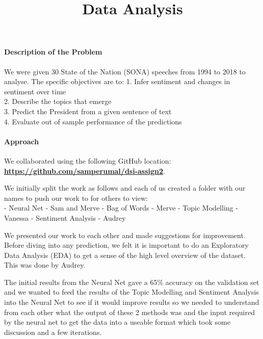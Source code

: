 \documentclass[]{article}
\title{Data Analysis}
\author{}
\date{}
\let\oldparagraph\paragraph
\renewcommand{\paragraph}[1]{\oldparagraph{#1}\mbox{}}
\begin{document}
\maketitle

\hypertarget{description-of-the-problem}{%
\paragraph{\texorpdfstring{\textbf{Description of the
Problem}}{Description of the Problem}}\label{description-of-the-problem}}

We were given 30 State of the Nation (SONA) speeches from 1994 to 2018
to analyse. The specific objectives are to: 1. Infer sentiment and
changes in sentiment over time\\
2. Describe the topics that emerge\\
3. Predict the President from a given sentence of text\\
4. Evaluate out of sample performance of the predictions

\hypertarget{approach}{%
\paragraph{\texorpdfstring{\textbf{Approach}}{Approach}}\label{approach}}

We collaborated using the following GitHub location:
\textbf{\url{https://github.com/samperumal/dsi-assign2}}.

We initially split the work as follows and each of us created a folder
with our names to push our work to for others to view:\\
- Neural Net - Sam and Merve - Bag of Words - Merve - Topic Modelling -
Vanessa - Sentiment Analysis - Audrey

We presented our work to each other and made suggestions for
improvement. Before diving into any prediction, we felt it is important
to do an Exploratory Data Analysis (EDA) to get a sense of the high
level overview of the dataset. This was done by Audrey.

The initial results from the Neural Net gave a 65\% accuracy on the
validation set and we wanted to feed the results of the Topic Modelling
and Sentiment Analysis into the Neural Net to see if it would improve
results so we needed to understand from each other what the output of
these 2 methods was and the input required by the neural net to get the
data into a useable format which took some discussion and a few
iterations.
\end{document}

